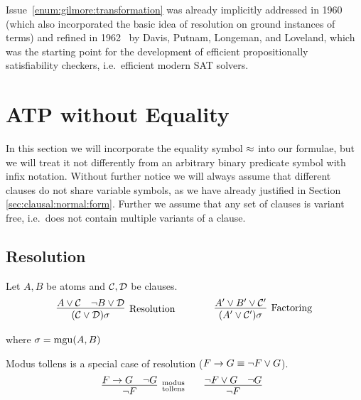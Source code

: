 Issue~\ref{enum:gilmore:transformation} was already implicitly
addressed in 1960~\cite{Davis:1960:CPQ:321033.321034}
(which also incorporated the basic idea of resolution on ground instances of terms)
and refined in 1962~\cite{Davis:1962:MPT:368273.368557}
by Davis, Putnam, Longeman, and Loveland,
which was the starting point for the development of efficient propositionally satisfiability checkers, i.e.~efficient modern SAT solvers.


\section{ATP without Equality}\label{sec:proving:without:equaltiy}

In this section we will incorporate the equality symbol \( \approx \) into our formulae,
but we will treat it not differently from an arbitrary binary predicate symbol with infix notation.
% 
Without further notice we will always assume 
that different clauses do not share variable symbols,
as we have already justified in Section \vref{sec:clausal:normal:form}.
Further we assume that any set of clauses is variant free, 
i.e.~does not contain multiple variants of a clause.

\subsection{Resolution}\label{sec:resolution}

\begin{definition}\label{def:resolution}
	Let \( A, B \) be atoms and 
	\( \mathcal{C}, \mathcal{D} \) be clauses.
	\begin{gather*}
	\infer
	[\text{Resolution}]
	{(\mcC\lor\mcD)\sigma}
	{A\lor\mcC&\lnot B\lor\mcD}
	\qquad\qquad
	\infer
	[\text{Factoring}]
	{(A'\lor\mcC')\sigma}
	{A'\lor B'\lor\mcC'}
	\end{gather*}
	\begin{center}
		where
		\( \sigma=\operatorname{mgu}(A,B) \)
	\end{center}
\end{definition}

\begin{example}Modus tollens is a special case of resolution (\( F\rightarrow G\equiv \lnot F\lor G \)).
	\begin{gather*}
	\infer[\substack{\text{modus}\\\text{tollens}}]
	{\lnot F}
	{F\limp G & \lnot G}
	\qquad
	\infer[]{\lnot F}{\lnot F\lor G & \lnot G}
	\end{gather*}
\end{example}

